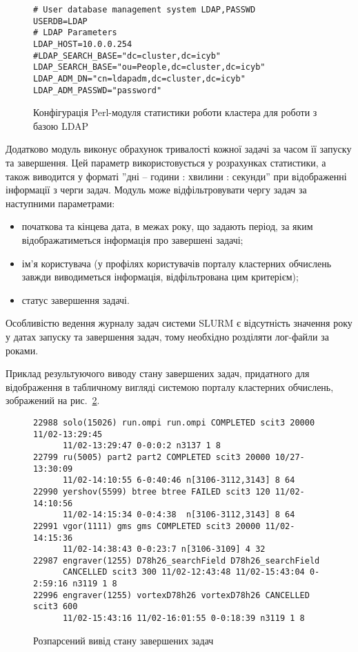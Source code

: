 \begin{figure}[!hb]
\begin{lstlisting}
# User database management system LDAP,PASSWD
USERDB=LDAP
# LDAP Parameters
LDAP_HOST=10.0.0.254
#LDAP_SEARCH_BASE="dc=cluster,dc=icyb"
LDAP_SEARCH_BASE="ou=People,dc=cluster,dc=icyb"
LDAP_ADM_DN="cn=ldapadm,dc=cluster,dc=icyb"
LDAP_ADM_PASSWD="password"
\end{lstlisting}
  \caption{Конфігурація Perl-модуля статистики роботи кластера для роботи з базою LDAP}
 \label{fig:slurm.perl.conf}
\end{figure}

Додатково модуль виконує обрахунок тривалості кожної задачі за часом її запуску та завершення. Цей параметр використовується у розрахунках статистики, а також виводится у форматі ''дні -- години : хвилини : секунди'' при відображенні інформації з черги задач. Модуль може відфільтровувати чергу задач за наступними параметрами:

\begin{itemize}
\item початкова та кінцева дата, в межах року, що задають період, за яким відображатиметься інформація про завершені задачі;
\item ім’я користувача (у профілях користувачів порталу кластерних обчислень завжди виводиметься інформація, відфільтрована цим критерієм);
\item статус завершення задачі.
\end{itemize}

Особливістю ведення журналу задач системи SLURM є відсутність значення року у датах запуску та завершення задач, тому необхідно розділяти лог-файли за роками.

Приклад результуючого виводу стану завершених задач, придатного для відображення в табличному вигляді системою порталу кластерних обчислень, зображений на рис.~\ref{fig:job.log}.

\begin{figure}[!hb]
\begin{lstlisting}
22988 solo(15026) run.ompi run.ompi COMPLETED scit3 20000 11/02-13:29:45
      11/02-13:29:47 0-0:0:2 n3137 1 8
22799 ru(5005) part2 part2 COMPLETED scit3 20000 10/27-13:30:09
      11/02-14:10:55 6-0:40:46 n[3106-3112,3143] 8 64
22990 yershov(5599) btree btree FAILED scit3 120 11/02-14:10:56
      11/02-14:15:34 0-0:4:38  n[3106-3112,3143] 8 64
22991 vgor(1111) gms gms COMPLETED scit3 20000 11/02-14:15:36
      11/02-14:38:43 0-0:23:7 n[3106-3109] 4 32
22987 engraver(1255) D78h26_searchField D78h26_searchField
      CANCELLED scit3 300 11/02-12:43:48 11/02-15:43:04 0-2:59:16 n3119 1 8
22996 engraver(1255) vortexD78h26 vortexD78h26 CANCELLED scit3 600
      11/02-15:43:16 11/02-16:01:55 0-0:18:39 n3119 1 8
\end{lstlisting}
  \caption{Розпарсений вивід стану завершених задач}
 \label{fig:job.log}
\end{figure}

